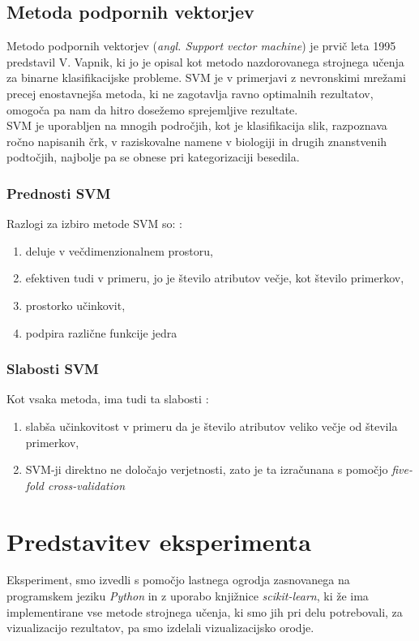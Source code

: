 \documentclass{acm_proc_article-sp}
\begin{document}
\subsection{Metoda podpornih vektorjev}
Metodo podpornih  vektorjev (\textit{angl. Support vector machine}) je prvič leta 1995 predstavil V. Vapnik\cite{Vapnik}, ki jo je opisal kot metodo nazdorovanega strojnega učenja za binarne klasifikacijske probleme. SVM je v primerjavi z nevronskimi mrežami precej enostavnejša metoda, ki ne zagotavlja ravno optimalnih rezultatov, omogoča pa nam da hitro dosežemo sprejemljive rezultate\cite{Hsu}.\\
SVM je uporabljen na mnogih področjih, kot je klasifikacija slik, razpoznava ročno napisanih črk, v raziskovalne namene v biologiji in drugih znanstvenih podtočjih, najbolje pa se obnese pri kategorizaciji besedila\cite{Wiki_svm}.\\
\subsubsection{Prednosti SVM}
Razlogi za izbiro metode SVM so: \cite{SciDev}:
\begin{enumerate}
\item{deluje v večdimenzionalnem prostoru,}
\item{efektiven tudi v primeru, jo je število atributov večje, kot število primerkov,}
\item{prostorko učinkovit,}
\item{podpira različne funkcije jedra}
\end{enumerate}

\subsubsection{Slabosti SVM}
Kot vsaka metoda, ima tudi ta slabosti \cite{SciDev}:
\begin{enumerate}
\item{slabša učinkovitost v primeru da je število atributov veliko večje od števila primerkov,}
\item{SVM-ji direktno ne določajo verjetnosti, zato je ta izračunana s pomočjo \textit{five-fold cross-validation}}
\end{enumerate}


\section{Predstavitev eksperimenta}
Eksperiment, smo izvedli s pomočjo lastnega ogrodja zasnovanega na programskem jeziku \textit{Python} in z uporabo knjižnice \textit{scikit-learn}, ki že ima implementirane vse metode strojnega učenja, ki smo jih pri delu potrebovali, za vizualizacijo rezultatov, pa smo izdelali vizualizacijsko orodje. 
\end{document}

